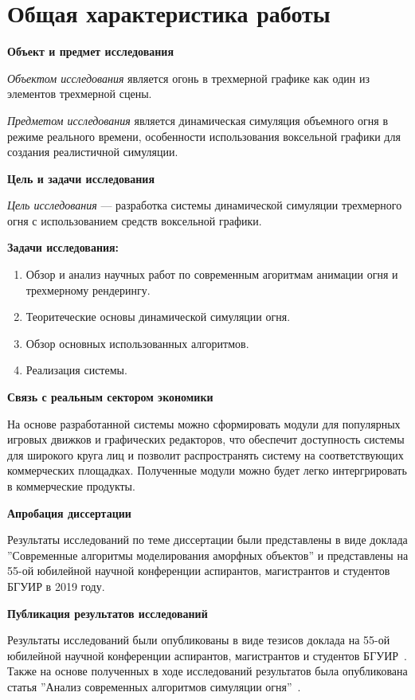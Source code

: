\part*{Общая характеристика работы}

\textbf{Объект и предмет исследования}

\emph{Объектом исследования} является огонь в трехмерной графике как один из элементов
трехмерной сцены.

\emph{Предметом исследования} является динамическая симуляция объемного огня в
режиме реального времени, особенности использования воксельной графики для
создания реалистичной симуляции.

\textbf{Цель и задачи исследования}

\emph{Цель исследования} --- разработка системы динамической симуляции
трехмерного огня с использованием средств воксельной графики.

\textbf{Задачи исследования:}

\begin{enumerate}
	\item Обзор и анализ научных работ по современным агоритмам анимации огня и
        трехмерному рендерингу.
	\item Теоритеческие основы динамической симуляции огня.
	\item Обзор основных использованных алгоритмов.
	\item Реализация системы.
\end{enumerate}

\textbf{Связь с реальным сектором экономики}

На основе разработанной системы можно
сформировать модули для популярных игровых движков и графических редакторов, что
обеспечит доступность системы для широкого круга лиц и позволит распространять
систему на соответствующих коммерческих площадках. Полученные модули можно будет
легко интергрировать в коммерческие продукты.

\textbf{Апробация диссертации}

Результаты исследований по теме диссертации были представлены в виде доклада
''Современные алгоритмы моделирования аморфных объектов'' и представлены на
55-ой юбилейной научной конференции аспирантов, магистрантов и студентов БГУИР
в 2019 году.

\textbf{Публикация результатов исследований}

Результаты исследований были опубликованы в виде тезисов доклада на
55-ой юбилейной научной конференции аспирантов, магистрантов и студентов БГУИР~\cite{55_sntk}.
Также на основе полученных в ходе исследований результатов была опубликована
статья ''Анализ современных алгоритмов симуляции огня''~\cite{mol_uch}.
